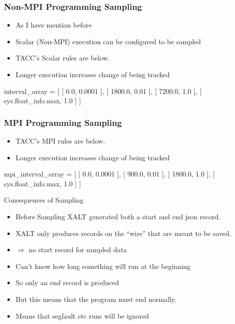 \documentclass{beamer}
\begin{document}
\begin{frame}[fragile]
    \frametitle{Non-MPI Programming Sampling}
  \begin{itemize}
    \item As I have mention before
    \item Scalar (Non-MPI) execution can be configured to be sampled
    \item TACC's Scalar rules are below.
    \item Longer execution increases change of being tracked
  \end{itemize}
 {\small
    \begin{semiverbatim}
interval\_array = [
    [    0.0,              0.0001 ],
    [ 1800.0,              0.01   ],
    [ 7200.0,              1.0    ],
    [ sys.float\_info.max,  1.0    ]
]
    \end{semiverbatim}
}

\end{frame}

\begin{frame}[fragile]
    \frametitle{MPI Programming Sampling}
  \begin{itemize}
    \item TACC's MPI rules are below.
    \item Longer execution increases change of being tracked
  \end{itemize}
 {\small
    \begin{semiverbatim}
mpi\_interval\_array = [
    [    0.0,              0.0001 ],
    [  900.0,              0.01   ],
    [ 1800.0,              1.0    ],
    [ sys.float\_info.max,  1.0    ]
]
    \end{semiverbatim}
}
\end{frame}

\begin{frame}{Consequences of Sampling}
  \begin{itemize}
    \item Before Sampling XALT generated both a start and end json
      record.
    \item XALT only produces records on the ``wire'' that are meant to
      be saved.
    \item $\Rightarrow$ no start record for sampled data
    \item Can't know how long something will run at the beginning
    \item So only an end record is produced
    \item But this means that the program must end normally.
    \item Means that segfault etc runs will be ignored
  \end{itemize}
\end{frame}
\end{document}
